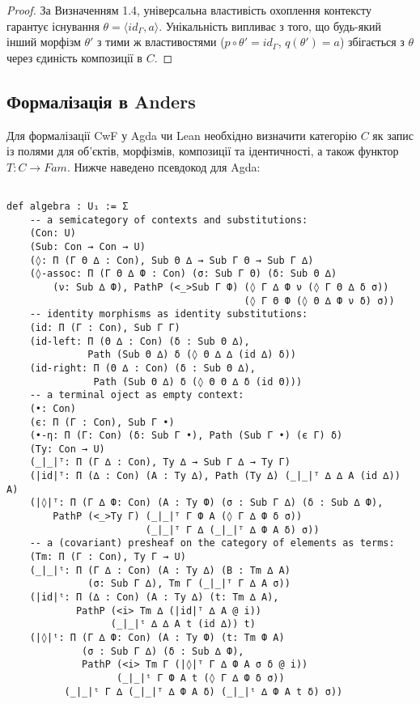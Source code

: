 \documentclass{article}
\theoremstyle{definition}
\begin{document}
\begin{proof}
За Визначенням 1.4, універсальна властивість охоплення контексту гарантує існування $\theta = \langle id_{\Gamma}, a \rangle$. Унікальність випливає з того, що будь-який інший морфізм $\theta'$ з тими ж властивостями ($p \circ \theta' = id_{\Gamma}$, $q(\theta') = a$) збігається з $\theta$ через єдиність композиції в $C$.
\end{proof}

\subsection{Формалізація в Anders}

Для формалізації CwF у Agda чи Lean необхідно визначити категорію $C$ як запис із полями для об’єктів, морфізмів, композиції та ідентичності, а також функтор $T:C \rightarrow Fam$. Нижче наведено псевдокод для Agda:

\begin{lstlisting}

def algebra : U₁ := Σ
    -- a semicategory of contexts and substitutions:
    (Con: U)
    (Sub: Con → Con → U)
    (◊: Π (Г Θ ∆ : Con), Sub Θ ∆ → Sub Г Θ → Sub Г ∆)
    (◊-assoc: Π (Г Θ ∆ Ф : Con) (σ: Sub Г Θ) (δ: Sub Θ ∆)
        (ν: Sub ∆ Ф), PathP (<_>Sub Г Ф) (◊ Г ∆ Ф ν (◊ Г Θ ∆ δ σ))
                                         (◊ Г Θ Ф (◊ Θ ∆ Ф ν δ) σ))
    -- identity morphisms as identity substitutions:
    (id: Π (Г : Con), Sub Г Г)
    (id-left: Π (Θ ∆ : Con) (δ : Sub Θ ∆),
              Path (Sub Θ ∆) δ (◊ Θ ∆ ∆ (id ∆) δ))
    (id-right: Π (Θ ∆ : Con) (δ : Sub Θ ∆),
               Path (Sub Θ ∆) δ (◊ Θ Θ ∆ δ (id Θ)))
    -- a terminal oject as empty context:
    (•: Con)
    (є: Π (Г : Con), Sub Г •)
    (•-η: Π (Г: Con) (δ: Sub Г •), Path (Sub Г •) (є Г) δ)
    (Ty: Con → U)
    (_|_|ᵀ: Π (Г ∆ : Con), Ty ∆ → Sub Г ∆ → Ty Г)
    (|id|ᵀ: Π (∆ : Con) (A : Ty ∆), Path (Ty ∆) (_|_|ᵀ ∆ ∆ A (id ∆)) A)
    (|◊|ᵀ: Π (Г ∆ Ф: Con) (A : Ty Ф) (σ : Sub Г ∆) (δ : Sub ∆ Ф),
        PathP (<_>Ty Г) (_|_|ᵀ Г Ф A (◊ Г ∆ Ф δ σ))
                        (_|_|ᵀ Г ∆ (_|_|ᵀ ∆ Ф A δ) σ))
    -- a (covariant) presheaf on the category of elements as terms:
    (Tm: Π (Г : Con), Ty Г → U)
    (_|_|ᵗ: Π (Г ∆ : Con) (A : Ty ∆) (B : Tm ∆ A)
              (σ: Sub Г ∆), Tm Г (_|_|ᵀ Г ∆ A σ))
    (|id|ᵗ: Π (∆ : Con) (A : Ty ∆) (t: Tm ∆ A),
            PathP (<i> Tm ∆ (|id|ᵀ ∆ A @ i))
                  (_|_|ᵗ ∆ ∆ A t (id ∆)) t)
    (|◊|ᵗ: Π (Г ∆ Ф: Con) (A : Ty Ф) (t: Tm Ф A)
             (σ : Sub Г ∆) (δ : Sub ∆ Ф),
             PathP (<i> Tm Г (|◊|ᵀ Г ∆ Ф A σ δ @ i))
                   (_|_|ᵗ Г Ф A t (◊ Г ∆ Ф δ σ))
          (_|_|ᵗ Г ∆ (_|_|ᵀ ∆ Ф A δ) (_|_|ᵗ ∆ Ф A t δ) σ))
\end{lstlisting}
\end{document}
